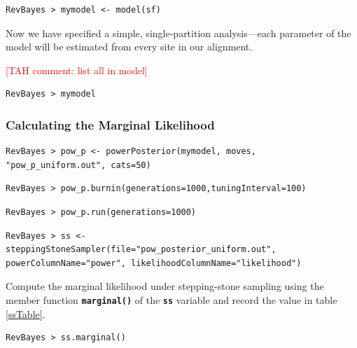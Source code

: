 \documentclass[11pt]{article}
\newcommand{\taha}[1]{{\textcolor{red}{[TAH comment: #1]}}} %
\newcommand{\cl}[1]{{\texttt{\textbf{#1}}}}
\begin{document}
{\tt \begin{snugshade*}
\begin{lstlisting}
RevBayes > mymodel <- model(sf)
\end{lstlisting}
\end{snugshade*}}

Now we have specified a simple, single-partition analysis---each parameter of the model will be estimated from every site in our alignment.

\taha{list all in model}
{\tt \begin{snugshade*}
\begin{lstlisting}
RevBayes > mymodel
\end{lstlisting}
\end{snugshade*}}


\subsubsection*{Calculating the Marginal Likelihood}

{\tt \begin{snugshade*}
\begin{lstlisting}
RevBayes > pow_p <- powerPosterior(mymodel, moves, "pow_p_uniform.out", cats=50) 
\end{lstlisting}
\end{snugshade*}}

{\tt \begin{snugshade*}
\begin{lstlisting}
RevBayes > pow_p.burnin(generations=1000,tuningInterval=100)
\end{lstlisting}
\end{snugshade*}}

{\tt \begin{snugshade*}
\begin{lstlisting}
RevBayes > pow_p.run(generations=1000)  
\end{lstlisting}
\end{snugshade*}}

{\tt \small \begin{snugshade*}
\begin{lstlisting}
RevBayes > ss <- steppingStoneSampler(file="pow_posterior_uniform.out", powerColumnName="power", likelihoodColumnName="likelihood")
\end{lstlisting}
\end{snugshade*}}

Compute the marginal likelihood under stepping-stone sampling using the member function \cl{marginal()} of the \cl{ss} variable and record the value in table \ref{ssTable}.
{\tt \begin{snugshade*}
\begin{lstlisting}
RevBayes > ss.marginal() 
\end{lstlisting}
\end{snugshade*}}
\end{document}
